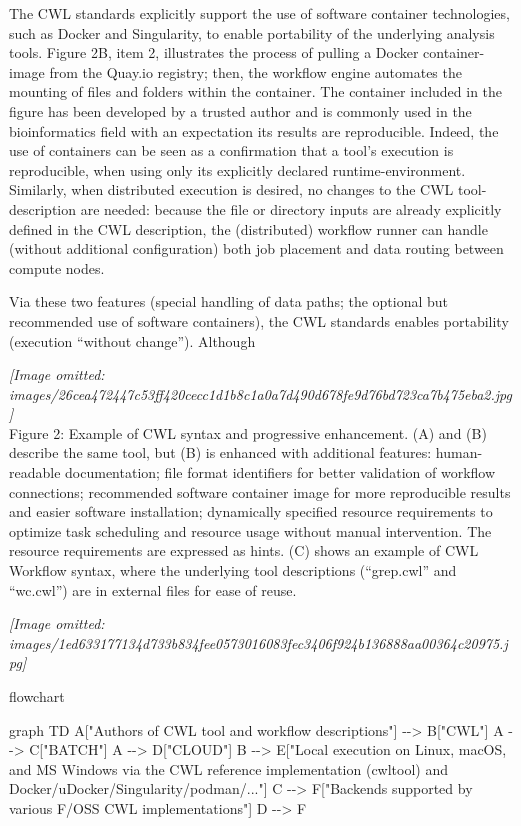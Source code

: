 \documentclass[
]{article}
\newenvironment{Shaded}{}{}
\newcommand{\NormalTok}[1]{#1}
\begin{document}
The CWL standards explicitly support the use of software container
technologies, such as Docker and Singularity, to enable portability of
the underlying analysis tools. Figure 2B, item 2, illustrates the
process of pulling a Docker container-image from the Quay.io registry;
then, the workflow engine automates the mounting of files and folders
within the container. The container included in the figure has been
developed by a trusted author and is commonly used in the bioinformatics
field with an expectation its results are reproducible. Indeed, the use
of containers can be seen as a confirmation that a tool's execution is
reproducible, when using only its explicitly declared
runtime-environment. Similarly, when distributed execution is desired,
no changes to the CWL tool-description are needed: because the file or
directory inputs are already explicitly defined in the CWL description,
the (distributed) workflow runner can handle (without additional
configuration) both job placement and data routing between compute
nodes.

Via these two features (special handling of data paths; the optional but
recommended use of software containers), the CWL standards enables
portability (execution ``without change''). Although

\textit{[Image omitted: images/26cea472447c53ff420cecc1d1b8c1a0a7d490d678fe9d76bd723ca7b475eba2.jpg]}\\
Figure 2: Example of CWL syntax and progressive enhancement. (A) and (B)
describe the same tool, but (B) is enhanced with additional features:
human-readable documentation; file format identifiers for better
validation of workflow connections; recommended software container image
for more reproducible results and easier software installation;
dynamically specified resource requirements to optimize task scheduling
and resource usage without manual intervention. The resource
requirements are expressed as hints. (C) shows an example of CWL
Workflow syntax, where the underlying tool descriptions (``grep.cwl''
and ``wc.cwl'') are in external files for ease of reuse.

\textit{[Image omitted: images/1ed633177134d733b834fee0573016083fec3406f924b136888aa00364c20975.jpg]}

flowchart

\begin{Shaded}
\begin{Highlighting}[]
\NormalTok{graph TD}
\NormalTok{    A["Authors of CWL tool and workflow descriptions"] {-}{-}\textgreater{} B["CWL"]}
\NormalTok{    A {-}{-}\textgreater{} C["BATCH"]}
\NormalTok{    A {-}{-}\textgreater{} D["CLOUD"]}
\NormalTok{    B {-}{-}\textgreater{} E["Local execution on Linux, macOS, and MS Windows via the CWL reference implementation (cwltool) and Docker/uDocker/Singularity/podman/..."]}
\NormalTok{    C {-}{-}\textgreater{} F["Backends supported by various F/OSS CWL implementations"]}
\NormalTok{    D {-}{-}\textgreater{} F}
\end{Highlighting}
\end{Shaded}
\end{document}
